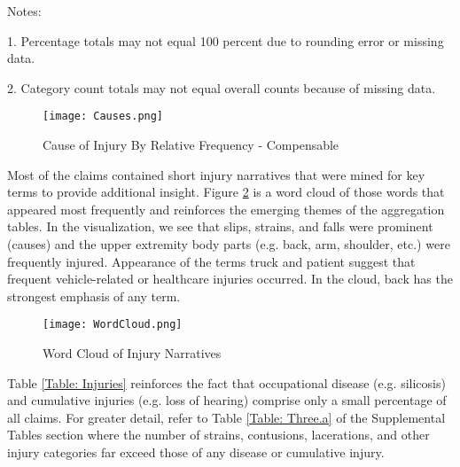 \documentclass[9pt, oneside]{article}   	%
\begin{document}
    \begin{tablenotes}
      \small
      Notes:\\
      \item 1. Percentage totals may not equal 100 percent due to rounding error or missing data.\\
      \item 2. Category count totals may not equal overall counts because of missing data.
    \end{tablenotes}




\begin{figure}[htp]
\caption{Cause of Injury By Relative Frequency - Compensable}
\hspace{0.1in}

\label{Fig: Causes}
\begin{center}
\texttt{[image: Causes.png]}
\end{center}

\end{figure}

\pagebreak




Most of the claims contained short injury narratives that were mined for key terms to provide additional insight. Figure \ref{Fig: WC} is a word cloud  of those words that appeared most frequently and reinforces the emerging themes of the aggregation tables. In the visualization, we see that slips, strains, and falls were prominent (causes) and the upper extremity body parts (e.g. back, arm, shoulder, etc.) were frequently injured. Appearance of the terms truck and patient suggest that frequent vehicle-related or healthcare injuries occurred. In the cloud, back has the strongest emphasis of any term.

\begin{figure}[!h]
\caption{Word Cloud of Injury Narratives}
\hspace{0.1in}

\label{Fig: WC}
\begin{center}
\texttt{[image: WordCloud.png]}
\end{center}

\end{figure}

\pagebreak

Table \ref{Table: Injuries} reinforces the fact that occupational disease (e.g. silicosis) and cumulative injuries (e.g. loss of hearing) comprise only a small percentage of all claims.  For greater detail, refer to Table \ref{Table: Three.a} of the Supplemental Tables section where the number of strains, contusions, lacerations, and other injury categories far exceed those of any disease or cumulative injury.
\end{document}
